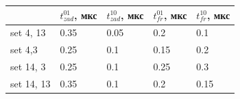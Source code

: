 \documentclass[a4paper,14pt]{article}
\begin{document}
\begin{table}[H]
		\begin{center}
	\begin{tabular}{|l|l|l|l|l|}
		\hline
		& $t_{zad}^{01}$, мкс & $t_{zad}^{10}$, мкс & $t_{fr}^{01}$, мкс & $t_{fr}^{10}$, мкс  \\ \hline
		set 4, 13 & 0.35 & 0.05 & 0.2 & 0.1 \\ \hline
		set 4,3 & 0.25 & 0.1 & 0.15 & 0.2 \\ \hline
		set 14, 3 & 0.25 & 0.1 & 0.25 & 0.3 \\ \hline
		set 14, 13 & 0.35 & 0.1 & 0.2 & 0.15 \\ \hline
	\end{tabular}
\end{center}
\end{table}
\end{document}
